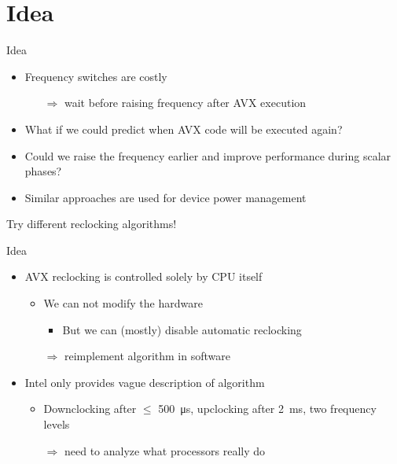 \section{Idea}
\begin{frame}[t]{Idea}
	\begin{itemize}
		\item Frequency switches are costly
		\begin{itemize}
			\item[$\Rightarrow$] wait before raising frequency after AVX execution
		\end{itemize}
		\pause
		\item What if we could predict when AVX code will be executed again?
		\item Could we raise the frequency earlier and improve performance during scalar phases?
		\item Similar approaches are used for device power management
	\end{itemize}
	\pause
	\begin{center}
		\vspace{1em}
		Try different reclocking algorithms!
	\end{center}
\end{frame}

\begin{frame}[t]{Idea}
	\begin{itemize}
		\item AVX reclocking is controlled solely by CPU itself
		\begin{itemize}
			\item We can not modify the hardware
			\begin{itemize}
				\item But we can (mostly) disable automatic reclocking
			\end{itemize}
			\item[$\Rightarrow$] reimplement algorithm in software
		\end{itemize}
		\pause
		\item Intel only provides vague description of algorithm
		\begin{itemize}
			\item Downclocking after $\leq$ \SI{500}{\micro\second}, upclocking after \SI{2}{\milli\second}, two frequency levels
			\item[$\Rightarrow$] need to analyze what processors really do
		\end{itemize}
	\end{itemize}
\end{frame}